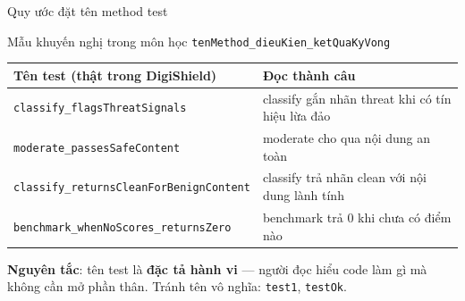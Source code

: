 \documentclass[aspectratio=169,12pt]{beamer}
\begin{document}
\begin{frame}{Quy ước đặt tên method test}
  \begin{block}{Mẫu khuyến nghị trong môn học}
    \centering
    \texttt{tenMethod\_dieuKien\_ketQuaKyVong}
  \end{block}

  \vspace{0.25em}
  \footnotesize
  \renewcommand{\arraystretch}{1.2}
  \begin{tabularx}{\textwidth}{l>{\raggedright\arraybackslash}X}
    \toprule
    \textbf{Tên test (thật trong DigiShield)} & \textbf{Đọc thành câu} \\
    \midrule
    \texttt{classify\_flagsThreatSignals} & classify gắn nhãn threat khi có tín hiệu lừa đảo \\
    \texttt{moderate\_passesSafeContent} & moderate cho qua nội dung an toàn \\
    \texttt{classify\_returnsCleanForBenignContent} & classify trả nhãn clean với nội dung lành tính \\
    \texttt{benchmark\_whenNoScores\_returnsZero} & benchmark trả 0 khi chưa có điểm nào \\
    \bottomrule
  \end{tabularx}
  \renewcommand{\arraystretch}{1}

  \vspace{0.25em}
  {\small \textbf{Nguyên tắc}: tên test là \textbf{đặc tả hành vi} --- người đọc
  hiểu code làm gì mà không cần mở phần thân. Tránh tên vô nghĩa:
  \texttt{test1}, \texttt{testOk}.}
\end{frame}
\end{document}
